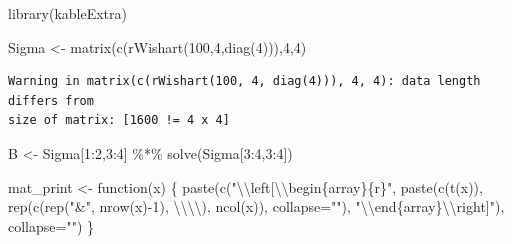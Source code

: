 \documentclass[
  letterpaper,
]{book}
\newenvironment{Shaded}{\begin{snugshade}}{\end{snugshade}}
\newcommand{\AttributeTok}[1]{\textcolor[rgb]{0.40,0.45,0.13}{#1}}
\newcommand{\ControlFlowTok}[1]{\textcolor[rgb]{0.00,0.23,0.31}{#1}}
\newcommand{\DecValTok}[1]{\textcolor[rgb]{0.68,0.00,0.00}{#1}}
\newcommand{\FunctionTok}[1]{\textcolor[rgb]{0.28,0.35,0.67}{#1}}
\newcommand{\NormalTok}[1]{\textcolor[rgb]{0.00,0.23,0.31}{#1}}
\newcommand{\OtherTok}[1]{\textcolor[rgb]{0.00,0.23,0.31}{#1}}
\newcommand{\SpecialCharTok}[1]{\textcolor[rgb]{0.37,0.37,0.37}{#1}}
\newcommand{\StringTok}[1]{\textcolor[rgb]{0.13,0.47,0.30}{#1}}
\begin{document}
\begin{Shaded}
\begin{Highlighting}[]
\FunctionTok{library}\NormalTok{(kableExtra)}

\NormalTok{Sigma }\OtherTok{\textless{}{-}} \FunctionTok{matrix}\NormalTok{(}\FunctionTok{c}\NormalTok{(}\FunctionTok{rWishart}\NormalTok{(}\DecValTok{100}\NormalTok{,}\DecValTok{4}\NormalTok{,}\FunctionTok{diag}\NormalTok{(}\DecValTok{4}\NormalTok{))),}\DecValTok{4}\NormalTok{,}\DecValTok{4}\NormalTok{)}
\end{Highlighting}
\end{Shaded}

\begin{verbatim}
Warning in matrix(c(rWishart(100, 4, diag(4))), 4, 4): data length differs from
size of matrix: [1600 != 4 x 4]
\end{verbatim}

\begin{Shaded}
\begin{Highlighting}[]
\NormalTok{B     }\OtherTok{\textless{}{-}}\NormalTok{ Sigma[}\DecValTok{1}\SpecialCharTok{:}\DecValTok{2}\NormalTok{,}\DecValTok{3}\SpecialCharTok{:}\DecValTok{4}\NormalTok{] }\SpecialCharTok{\%*\%} \FunctionTok{solve}\NormalTok{(Sigma[}\DecValTok{3}\SpecialCharTok{:}\DecValTok{4}\NormalTok{,}\DecValTok{3}\SpecialCharTok{:}\DecValTok{4}\NormalTok{])}

\NormalTok{mat\_print }\OtherTok{\textless{}{-}} \ControlFlowTok{function}\NormalTok{(x) \{}
  \FunctionTok{paste}\NormalTok{(}\FunctionTok{c}\NormalTok{(}\StringTok{"}\SpecialCharTok{\textbackslash{}\textbackslash{}}\StringTok{left[}\SpecialCharTok{\textbackslash{}\textbackslash{}}\StringTok{begin\{array\}\{r\}"}\NormalTok{, }
          \FunctionTok{paste}\NormalTok{(}\FunctionTok{c}\NormalTok{(}\FunctionTok{t}\NormalTok{(x)),}
                \FunctionTok{rep}\NormalTok{(}\FunctionTok{c}\NormalTok{(}\FunctionTok{rep}\NormalTok{(}\StringTok{"\&"}\NormalTok{, }\FunctionTok{nrow}\NormalTok{(x)}\SpecialCharTok{{-}}\DecValTok{1}\NormalTok{), }\StringTok{\textquotesingle{}}\SpecialCharTok{\textbackslash{}\textbackslash{}\textbackslash{}\textbackslash{}}\StringTok{\textquotesingle{}}\NormalTok{), }\FunctionTok{ncol}\NormalTok{(x)),}
                \AttributeTok{collapse=}\StringTok{""}\NormalTok{), }
          \StringTok{"}\SpecialCharTok{\textbackslash{}\textbackslash{}}\StringTok{end\{array\}}\SpecialCharTok{\textbackslash{}\textbackslash{}}\StringTok{right]"}\NormalTok{), }\AttributeTok{collapse=}\StringTok{""}\NormalTok{)}
\NormalTok{\}}
\end{Highlighting}
\end{Shaded}
\end{document}
